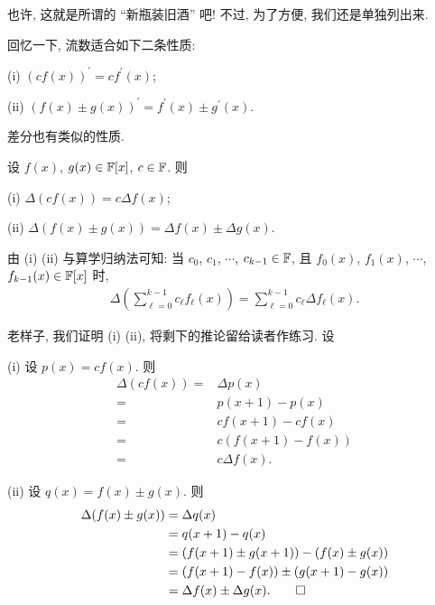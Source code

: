 \begin{pf}
    也许, 这就是所谓的 ``新瓶装旧酒'' 吧! 不过, 为了方便, 我们还是单独列出来.
\end{pf}

回忆一下, 流数适合如下二条性质:

(i) $(cf(x))^{\prime} = c f^{\prime} (x)$;

(ii) $(f(x) \pm g(x))^{\prime} = f^{\prime} (x) \pm g^{\prime} (x)$.

差分也有类似的性质.

\begin{proposition}
    设 $f(x)$, $g(x) \in \mathbb{F}[x]$, $c \in \mathbb{F}$. 则

    (i) $\Delta (cf(x)) = c \Delta f(x)$;

    (ii) $\Delta (f(x) \pm g(x)) = \Delta f(x) \pm \Delta g(x)$.

    由 (i) (ii) 与算学归纳法可知: 当 $c_0$, $c_1$, $\cdots$, $c_{k-1} \in \mathbb{F}$, 且 $f_0 (x)$, $f_1 (x)$, $\cdots$, $f_{k-1} (x) \in \mathbb{F}[x]$ 时,
    \begin{align*}
        \Delta \left( \sum_{\ell = 0}^{k-1} c_\ell f_\ell (x) \right)
        = \sum_{\ell = 0}^{k-1} c_\ell \Delta f_\ell (x).
    \end{align*}
\end{proposition}

\begin{pf}
    老样子, 我们证明 (i) (ii), 将剩下的推论留给读者作练习. 设

    (i) 设 $p(x) = cf(x)$. 则
    \begin{align*}
        \Delta (cf(x))
        = {} & \Delta p(x)      \\
        = {} & p(x+1) - p(x)    \\
        = {} & cf(x+1) - cf(x)  \\
        = {} & c(f(x+1) - f(x)) \\
        = {} & c \Delta f(x).
    \end{align*}

    (ii) 设 $q(x) = f(x) \pm g(x)$. 则
    \begin{align*}
        \Delta (f(x) \pm g(x))
        = {} & \Delta q(x)                           \\
        = {} & q(x+1) - q(x)                         \\
        = {} & (f(x+1) \pm g(x+1)) - (f(x) \pm g(x)) \\
        = {} & (f(x+1) - f(x)) \pm (g(x+1) - g(x))   \\
        = {} & \Delta f(x) \pm \Delta g(x). \qedhere
    \end{align*}
\end{pf}

